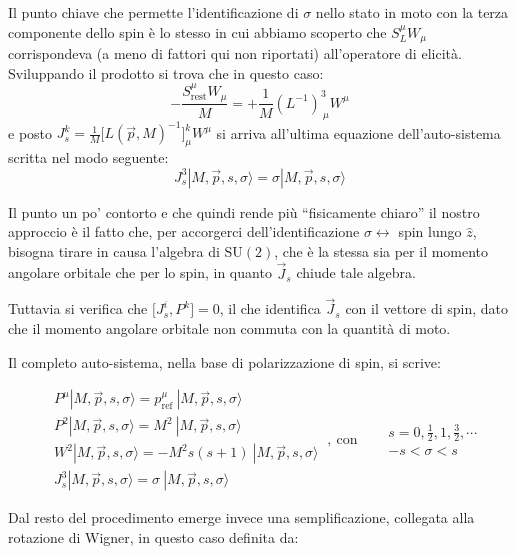 \documentclass[../main.tex]{subfiles}
\begin{document}
Il punto chiave che permette l'identificazione di \(\sigma\) nello stato in moto con la terza componente dello spin è lo stesso in cui abbiamo scoperto che \(S_L^\mu W_\mu\) corrispondeva (a meno di fattori qui non riportati) all'operatore di elicità. Sviluppando il prodotto si trova che in questo caso:
\[
-\frac{S^\mu_\text{rest}W_\mu}{M} = +\frac{1}{M}(L^{-1})^3_{~\mu}W^\mu
\]
e posto \(J_s^k = \frac{1}{M}\big[L(\Vec{p}, M)^{-1}\big]^k_{\mu}W^\mu\) si arriva all'ultima equazione dell'auto-sistema scritta nel modo seguente:
\[
J^3_s|M, \Vec{p}, s, \sigma\rangle = \sigma|M, \Vec{p}, s, \sigma\rangle 
\]

Il punto un po' contorto e che quindi rende più “fisicamente chiaro” il nostro approccio è il fatto che, per accorgerci dell'identificazione $\sigma\leftrightarrow $ spin lungo $\hat{z}$, bisogna tirare in causa l'algebra di $\text{SU}(2)$, che è la stessa sia per il momento angolare orbitale che per lo spin, in quanto $\Vec{J}_s$ chiude tale algebra. 

Tuttavia si verifica che $\big[J_s^i, P^k\big]=0$, il che identifica $\Vec{J}_s$ con il vettore di spin, dato che il momento angolare orbitale non commuta con la quantità di moto.

Il completo auto-sistema, nella base di polarizzazione di spin, si scrive:

\begin{equation}
    \boxed{
        \begin{aligned}
            &P^\mu|M, \Vec{p}, s, \sigma\rangle = p^\mu_\text{ref}~|M, \Vec{p}, s, \sigma\rangle\\
            &P^2|M, \Vec{p}, s, \sigma\rangle = M^2~|M, \Vec{p}, s, \sigma\rangle\\
            &W^2|M, \Vec{p}, s, \sigma\rangle = -M^2 s(s+1)~|M, \Vec{p}, s, \sigma\rangle\\
            &J^3_s|M, \Vec{p}, s, \sigma\rangle = \sigma~|M, \Vec{p}, s, \sigma\rangle
        \end{aligned}
        }~,~ \text{con} \quad
        \begin{aligned}
            &s=0,\frac{1}{2},1,\frac{3}{2},\cdots\\
            &-s<\sigma<s
        \end{aligned}
    \label{eq:final_eigensystem_massive_weinberg}
\end{equation}


Dal resto del procedimento emerge invece una semplificazione, collegata alla rotazione di Wigner, in questo caso definita da:
\end{document}
